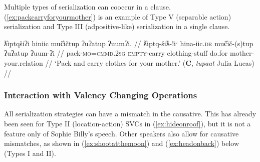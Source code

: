 \begin{comment}
Something similar happened with Sophie Billy. Sentence () is from a translation text she has been working on, and I asked about rephrases () and (). While I was interpreting () as manner and action (Type I), I think she, in the context of the story, saw them as sequential (Type V): lead and then bring back. In this context, the reordering of () is nonsense: One cannot bring someone back and then lead them.

\ex \label{ex:leadbringback}
\begingl
\glpreamble m̓aw̓aaƛint ḥaaw̓iłƛisi huʔacap̓ƛ. //
\gla m̓aw̓aa=!aƛ=int ḥaaw̓iłƛ=ʔis=ʔiˑ huʔa-ci-!ap=!aƛ //
\glb lead=\textsc{now}=\textsc{pst} young.man=\textsc{dimin}=\textsc{art} back-go=\textsc{caus}\textsc{now} //
\glft `She led the young man and took him back.' (\textbf{Q}, Sophie Billy) //
\endgl
\xe

NB: This is due to obj-verb ordering of ex. 3
BM
yaacukw̓it̓asaḥ waałak c̓uumaʕas
*yaacukw̓it̓asaḥ c̓uumaʕas
*yaacukw̓it̓asaḥ c̓uumaʕas waałak


NB: This may be due to the !aƛ forcing a two-sentence interpretation
SB
m̓aw̓aaƛint ḥaaw̓iłƛisi huʔacap̓ƛ
m̓aw̓aaƛint huʔacap̓ƛ ḥaaw̓iłƛisi
*huʔacap̓ƛint m̓aw̓aaƛ ḥaaw̓iłƛisi 
\end{comment}

Multiple types of serialization can cooccur in a clause. (\ref{ex:packcarryforyourmother}) is an example of Type V (separable action) serialization and Type III (adpositive-like) serialization in a single clause.

\ex \label{ex:packcarryforyourmother}
\begingl
\glpreamble ƛ̓iptqšiʔi hiniic muč̓ičtup ʔuʔatup ʔuumʔi. //
\gla ƛ̓iptq-šiƛ-!iˑ hina-iic.\textsc{dr} muč̓ič-(s)tup ʔuʔatup ʔuum-ʔi //
\glb pack-\textsc{mo}=\textsc{cmmd.2sg} \textsc{empty}-carry clothing-stuff do.for mother-your.relation //
\glft `Pack and carry clothes for your mother.' (\textbf{C}, \textit{tupaat} Julia Lucas) //
\endgl
\xe

\subsubsection{Interaction with Valency Changing Operations}

All serialization strategies can have a mismatch in the causative. This has already been seen for Type II (location-action) SVCs in (\ref{ex:hideonroof}), but it is not a feature only of Sophie Billy's speech. Other speakers also allow for causative mismatches, as shown in (\ref{ex:shootatthemoon}) and (\ref{ex:headonback}) below (Types I and II).


